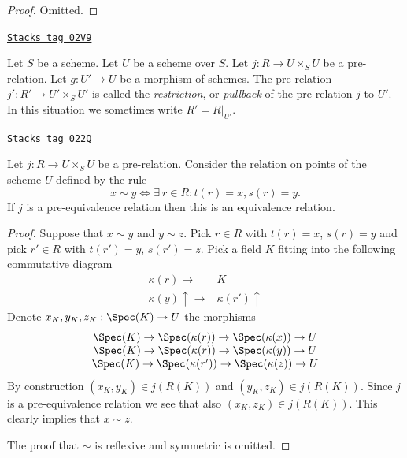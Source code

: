 \begin{proof}
Omitted.
\end{proof}

\begin{definition}
\label{groupoids-definition-restrict-relation}
\href{https://stacks.math.columbia.edu/tag/02V9}{\texttt{Stacks tag 02V9}}

Let $S$ be a scheme.
Let $U$ be a scheme over $S$.
Let $j : R \to U \times_S U$ be a pre-relation.
Let $g : U' \to U$ be a morphism of schemes.
The pre-relation $j' : R' \to U' \times_S U'$ is called
the {\it restriction}, or {\it pullback} of the pre-relation $j$ to $U'$.
In this situation we sometimes write $R' = R|_{U'}$.
\end{definition}

\begin{lemma}
\label{groupoids-lemma-pre-equivalence-equivalence-relation-points}
\href{https://stacks.math.columbia.edu/tag/022Q}{\texttt{Stacks tag 022Q}}

Let $j : R \to U \times_S U$ be a pre-relation.
Consider the relation on points of the scheme $U$ defined by
the rule
$$
x \sim y
\Leftrightarrow
\exists\ r \in R :
t(r) = x,
s(r) = y.
$$
If $j$ is a pre-equivalence relation then this is an
equivalence relation.
\end{lemma}

\begin{proof}
Suppose that $x \sim y$ and $y \sim z$.
Pick $r \in R$ with $t(r) = x$, $s(r) = y$ and
pick $r' \in R$ with $t(r') = y$, $s(r') = z$.
Pick a field $K$ fitting into the following commutative
diagram
$$
\begin{array}{cc}\kappa(r) \longrightarrow & K \\ \kappa(y) \uparrow\longrightarrow & \kappa(r') \uparrow\end{array}
$$
Denote $x_K, y_K, z_K : \Spec(K) \to U$
the morphisms
$$
\begin{matrix}
\Spec(K) \to \Spec(\kappa(r))
\to
\Spec(\kappa(x)) \to U \\
\Spec(K) \to \Spec(\kappa(r))
\to
\Spec(\kappa(y)) \to U \\
\Spec(K) \to \Spec(\kappa(r'))
\to
\Spec(\kappa(z)) \to U
\end{matrix}
$$
By construction $(x_K, y_K) \in j(R(K))$ and
$(y_K, z_K) \in j(R(K))$. Since $j$ is a pre-equivalence relation
we see that also $(x_K, z_K) \in j(R(K))$.
This clearly implies that $x \sim z$.

\medskip\noindent
The proof that $\sim$ is reflexive and symmetric is omitted.
\end{proof}

